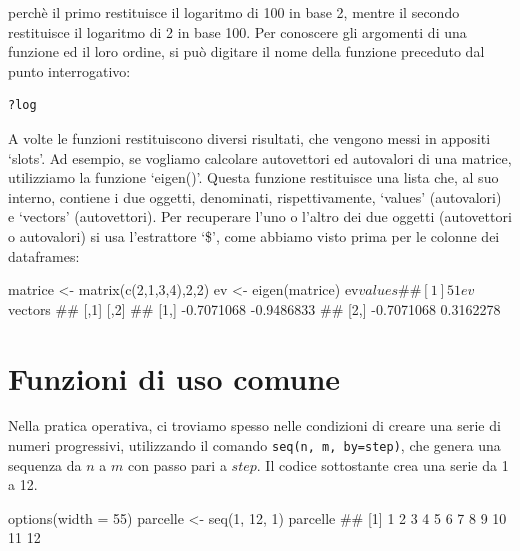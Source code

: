 \documentclass[a4paper,12pt,oneside]{book}
\newenvironment{Shaded}{\begin{snugshade}}{\end{snugshade}}
\newcommand{\DecValTok}[1]{#1}
\newcommand{\SpecialCharTok}[1]{#1}
\newcommand{\DocumentationTok}[1]{#1}
\newcommand{\OtherTok}[1]{#1}
\newcommand{\FunctionTok}[1]{#1}
\newcommand{\AttributeTok}[1]{#1}
\newcommand{\NormalTok}[1]{#1}
\begin{document}
perchè il primo restituisce il logaritmo di 100 in base 2, mentre il secondo restituisce il logaritmo di 2 in base 100. Per conoscere gli argomenti di una funzione ed il loro ordine, si può digitare il nome della funzione preceduto dal punto interrogativo:

\begin{verbatim}
?log
\end{verbatim}

A volte le funzioni restituiscono diversi risultati, che vengono messi in appositi `slots'. Ad esempio, se vogliamo calcolare autovettori ed autovalori di una matrice, utilizziamo la funzione `eigen()'. Questa funzione restituisce una lista che, al suo interno, contiene i due oggetti, denominati, rispettivamente, `values' (autovalori) e `vectors' (autovettori). Per recuperare l'uno o l'altro dei due oggetti (autovettori o autovalori) si usa l'estrattore `\$', come abbiamo visto prima per le colonne dei dataframes:

\begin{Shaded}
\begin{Highlighting}[]
\NormalTok{matrice  }\OtherTok{\textless{}{-}}  \FunctionTok{matrix}\NormalTok{(}\FunctionTok{c}\NormalTok{(}\DecValTok{2}\NormalTok{,}\DecValTok{1}\NormalTok{,}\DecValTok{3}\NormalTok{,}\DecValTok{4}\NormalTok{),}\DecValTok{2}\NormalTok{,}\DecValTok{2}\NormalTok{)}
\NormalTok{ev  }\OtherTok{\textless{}{-}}  \FunctionTok{eigen}\NormalTok{(matrice)}
\NormalTok{ev}\SpecialCharTok{$}\NormalTok{values}
\DocumentationTok{\#\# [1] 5 1}
\NormalTok{ev}\SpecialCharTok{$}\NormalTok{vectors}
\DocumentationTok{\#\#            [,1]       [,2]}
\DocumentationTok{\#\# [1,] {-}0.7071068 {-}0.9486833}
\DocumentationTok{\#\# [2,] {-}0.7071068  0.3162278}
\end{Highlighting}
\end{Shaded}

\hypertarget{funzioni-di-uso-comune}{%
\section{Funzioni di uso comune}\label{funzioni-di-uso-comune}}

Nella pratica operativa, ci troviamo spesso nelle condizioni di creare una serie di numeri progressivi, utilizzando il comando \texttt{seq(n,\ m,\ by=step)}, che genera una sequenza da \(n\) a \(m\) con passo pari a \(step\). Il codice sottostante crea una serie da 1 a 12.

\begin{Shaded}
\begin{Highlighting}[]
\FunctionTok{options}\NormalTok{(}\AttributeTok{width =} \DecValTok{55}\NormalTok{)}
\NormalTok{parcelle  }\OtherTok{\textless{}{-}}  \FunctionTok{seq}\NormalTok{(}\DecValTok{1}\NormalTok{, }\DecValTok{12}\NormalTok{, }\DecValTok{1}\NormalTok{)}
\NormalTok{parcelle}
\DocumentationTok{\#\#  [1]  1  2  3  4  5  6  7  8  9 10 11 12}
\end{Highlighting}
\end{Shaded}
\end{document}
